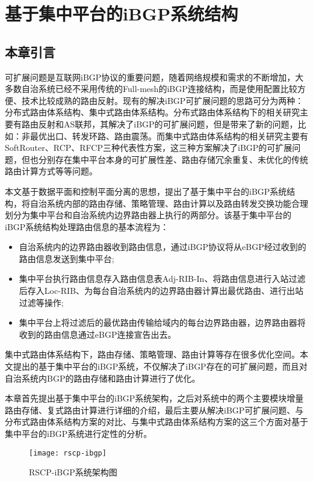 \chapter{基于集中平台的iBGP系统结构}
\label{cha:china}


\section{本章引言}
可扩展问题是互联网iBGP协议的重要问题，随着网络规模和需求的不断增加，大多数自治系统已经不采用传统的Full-mesh的iBGP连接结构，而是使用配置比较方便、技术比较成熟的路由反射。现有的解决iBGP可扩展问题的思路可分为两种：分布式路由体系结构、集中式路由体系结构。分布式路由体系结构下的相关研究主要有路由反射和AS联邦，其解决了iBGP的可扩展问题，但是带来了新的问题，比如：非最优出口、转发环路、路由震荡。而集中式路由体系结构的相关研究主要有SoftRouter、RCP、RFCP三种代表性方案，这三种方案解决了iBGP的可扩展问题，但也分别存在集中平台本身的可扩展性差、路由存储冗余重复、未优化的传统路由计算方式等等问题。

本文基于数据平面和控制平面分离的思想，提出了基于集中平台的iBGP系统结构，将自治系统内部的路由存储、策略管理、路由计算以及路由转发交换功能合理划分为集中平台和自治系统内边界路由器上执行的两部分。该基于集中平台的iBGP系统结构处理路由信息的基本流程为：
\begin{itemize}
  \item 自治系统内的边界路由器收到路由信息，通过iBGP协议将从eBGP经过收到的路由信息发送到集中平台;
  \item 集中平台执行路由信息存入路由信息表Adj-RIB-In、将路由信息进行入站过滤后存入Loc-RIB、为每台自治系统内的边界路由器计算出最优路由、进行出站过滤等操作;
  \item 集中平台上将过滤后的最优路由传输给域内的每台边界路由器，边界路由器将收到的路由信息通过eBGP连接宣告出去。
\end{itemize}

集中式路由体系结构下，路由存储、策略管理、路由计算等存在很多优化空间。本文提出的基于集中平台的iBGP系统，不仅解决了iBGP存在的可扩展问题，而且对自治系统内BGP的路由存储和路由计算进行了优化。

本章首先提出基于集中平台的iBGP系统架构，之后对系统中的两个主要模块增量路由存储、复式路由计算进行详细的介绍，最后主要从解决iBGP可扩展问题、与分布式路由体系结构方案的对比、与集中式路由体系结构方案的这三个方面对基于集中平台的iBGP系统进行定性的分析。



\begin{figure}
  \centering
  \texttt{[image: rscp-ibgp]}
  \caption{RSCP-iBGP系统架构图}
  \label{fig:rscp-ibgp}
\end{figure}

